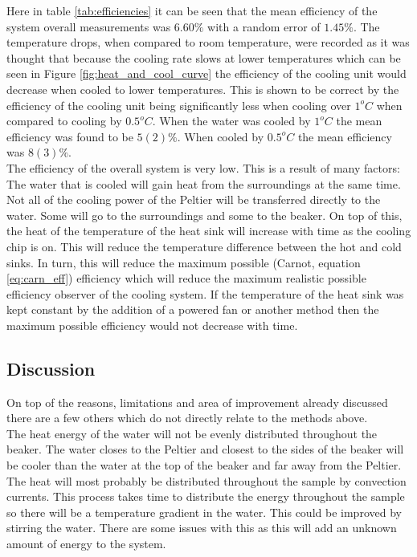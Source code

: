 \documentclass[10pt]{article}
\begin{document}
Here in table \ref{tab:efficiencies} it can be seen that the mean efficiency of the system overall measurements was $6.60\%$ with a random error of $1.45\%$. The temperature drops, when compared to room temperature, were recorded as it was thought that because the cooling rate slows at lower temperatures which can be seen in Figure \ref{fig:heat_and_cool_curve} the efficiency of the cooling unit would decrease when cooled to lower temperatures. This is shown to be correct by the efficiency of the cooling unit being significantly less when cooling over $1^oC$ when compared to cooling by $0.5^oC$. When the water was cooled by $1^oC$ the mean efficiency was found to be $5(2)\%$. When cooled by $0.5^oC$ the mean efficiency was $8(3)\%$.\\

The efficiency of the overall system is very low. This is a result of many factors: The water that is cooled will gain heat from the surroundings at the same time. Not all of the cooling power of the Peltier will be transferred directly to the water. Some will go to the surroundings and some to the beaker. On top of this, the heat of the temperature of the heat sink will increase with time as the cooling chip is on. This will reduce the temperature difference between the hot and cold sinks. In turn, this will reduce the maximum possible (Carnot, equation \ref{eq:carn_eff}) efficiency which will reduce the maximum realistic possible efficiency observer of the cooling system. If the temperature of the heat sink was kept constant by the addition of a powered fan or another method then the maximum possible efficiency would not decrease with time. 


\subsection*{Discussion}
On top of the reasons, limitations and area of improvement already discussed there are a few others which do not directly relate to the methods above.\\

The heat energy of the water will not be evenly distributed throughout the beaker. The water closes to the Peltier and closest to the sides of the beaker will be cooler than the water at the top of the beaker and far away from the Peltier. The heat will most probably be distributed throughout the sample by convection currents\cite{conv_cur}. This process takes time to distribute the energy throughout the sample so there will be a temperature gradient in the water. This could be improved by stirring the water. There are some issues with this as this will add an unknown amount of energy to the system.\\
\end{document}
